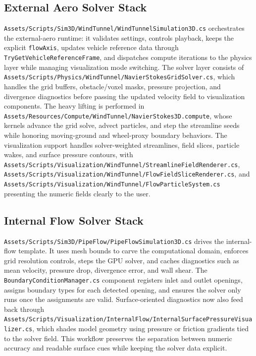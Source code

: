 \documentclass[12pt,a4paper,titlepage]{report}
\begin{document}
\subsection{External Aero Solver Stack}
\texttt{Assets/Scripts/Sim3D/WindTunnel/WindTunnelSimulation3D.cs} orchestrates the external-aero runtime: it validates settings, controls playback, keeps the explicit \texttt{flowAxis}, updates vehicle reference data through \texttt{TryGetVehicleReferenceFrame}, and dispatches compute iterations to the physics layer while managing visualization mode switching. The solver layer consists of \texttt{Assets/Scripts/Physics/WindTunnel/NavierStokesGridSolver.cs}, which handles the grid buffers, obstacle/voxel masks, pressure projection, and divergence diagnostics before passing the updated velocity field to visualization components. The heavy lifting is performed in \texttt{Assets/Resources/Compute/WindTunnel/NavierStokes3D.compute}, whose kernels advance the grid solve, advect particles, and step the streamline seeds while honoring moving-ground and wheel-proxy boundary behaviors. The visualization support handles solver-weighted streamlines, field slices, particle wakes, and surface pressure contours, with \texttt{Assets/Scripts/Visualization/WindTunnel/StreamlineFieldRenderer.cs}, \texttt{Assets/Scripts/Visualization/WindTunnel/FlowFieldSliceRenderer.cs}, and \texttt{Assets/Scripts/Visualization/WindTunnel/FlowParticleSystem.cs} presenting the numeric fields clearly to the user.

\subsection{Internal Flow Solver Stack}
\texttt{Assets/Scripts/Sim3D/PipeFlow/PipeFlowSimulation3D.cs} drives the internal-flow template. It uses mesh bounds to carve the computational domain, enforces grid resolution controls, steps the GPU solver, and caches diagnostics such as mean velocity, pressure drop, divergence error, and wall shear. The \texttt{BoundaryConditionManager.cs} component registers inlet and outlet openings, assigns boundary types for each detected opening, and ensures the solver only runs once the assignments are valid. Surface-oriented diagnostics now also feed back through \texttt{Assets/Scripts/Visualization/InternalFlow/InternalSurfacePressureVisualizer.cs}, which shades model geometry using pressure or friction gradients tied to the solver field. This workflow preserves the separation between numeric accuracy and readable surface cues while keeping the solver data explicit.
\end{document}
